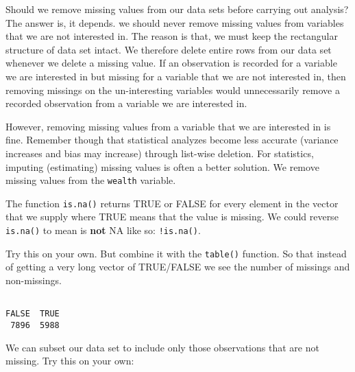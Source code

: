\documentclass[]{article}
\newenvironment{Shaded}{\begin{snugshade}}{\end{snugshade}}
\newcommand{\KeywordTok}[1]{\textcolor[rgb]{0.13,0.29,0.53}{\textbf{#1}}}
\newcommand{\NormalTok}[1]{#1}
\newcommand{\OperatorTok}[1]{\textcolor[rgb]{0.81,0.36,0.00}{\textbf{#1}}}
\newcommand{\StringTok}[1]{\textcolor[rgb]{0.31,0.60,0.02}{#1}}
\begin{document}
Should we remove missing values from our data sets before carrying out analysis? The answer is, it depends. we should never remove missing values from variables that we are not interested in. The reason is that, we must keep the rectangular structure of data set intact. We therefore delete entire rows from our data set whenever we delete a missing value. If an observation is recorded for a variable we are interested in but missing for a variable that we are not interested in, then removing missings on the un-interesting variables would unnecessarily remove a recorded observation from a variable we are interested in.

However, removing missing values from a variable that we are interested in is fine. Remember though that statistical analyzes become less accurate (variance increases and bias may increase) through list-wise deletion. For statistics, imputing (estimating) missing values is often a better solution. We remove missing values from the \texttt{wealth} variable.

The function \texttt{is.na()} returns TRUE or FALSE for every element in the vector that we supply where TRUE means that the value is missing. We could reverse \texttt{is.na()} to mean is \textbf{not} NA like so: \texttt{!is.na()}.

Try this on your own. But combine it with the \texttt{table()} function. So that instead of getting a very long vector of TRUE/FALSE we see the number of missings and non-missings.

\begin{Shaded}
\end{Shaded}

\begin{verbatim}

FALSE  TRUE 
 7896  5988 
\end{verbatim}

We can subset our data set to include only those observations that are not missing. Try this on your own:

\begin{Shaded}
\end{Shaded}
\end{document}
